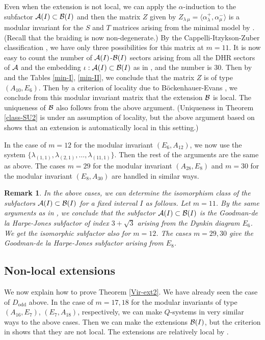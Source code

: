 \documentclass[12pt]{article}
\def\lan{\langle}
\def\ran{\rangle}
\def\a{\alpha}
\def\la{\lambda}
\newtheorem{remark}[theorem]{Remark}
\def\N{{\cal A}}
\def\M{{\cal B}}
\begin{document}
Even when the extension
is not local, we can apply the $\a$-induction to the subfactor
$\N(I)\subset \M(I)$ and then the matrix $Z$ given by
$Z_{\la\,\mu}=\lan \a^+_\la,\a^-_\mu\ran$
is a modular invariant for the $S$ and $T$ matrices arising
from the minimal model by \cite[Corollary 5.8]{BEK1}.  (Recall that
the braiding is now non-degenerate.)
By the Cappelli-Itzykson-Zuber classification \cite{CIZ}, we have only
three possibilities for this matrix at $m=11$.  It is now easy to
count the number of $\N(I)$-$\M(I)$ sectors arising from all
the DHR sectors of $\N$ and the embedding $\iota:
\N(I)\subset \M(I)$ as in \cite{BEK1,BEK2}, and
the number is 30.  Then by \cite{BEK1} and the Tables 
\ref{min-I}, \ref{min-II},
we conclude that the matrix $Z$ is of type $(A_{10}, E_6)$.
Then by a criterion of locality due to B\"ockenhauer-Evans
\cite[Proposition 3.2]{BE4}, we conclude from this modular invariant
matrix that the extension $\M$ is local.  The uniqueness of
$\M$ also follows from the above argument.
(Uniqueness in Theorem \ref{class-SU2} is under an assumption of
locality, but the above argument based on \cite{BE4} shows that
an extension is automatically local in this setting.)

In the case of $m=12$ for the modular invariant $(E_6, A_{12})$,
we now use the system
$\{\la_{(1,1)},\la_{(2,1)},\dots,\la_{(11,1)}\}$.  Then the
rest of the arguments are the same as above.
The cases $m=29$ for the modular invariant $(A_{28},E_8)$
and $m=30$ for the modular invariant $(E_8, A_{30})$ are handled
in similar ways.

\begin{remark}{\rm
In the above cases, we can determine the isomorphism class of the 
subfactors $\N(I)\subset \M(I)$ for a fixed interval $I$ as follows.
Let $m=11$.  By the same arguments as in \cite[Appendix]{BEK2},
we conclude that the subfactor $\N(I)\subset \M(I)$ is the Goodman-de 
la Harpe-Jones subfactor \cite[Section 4.5]{GHJ} of index $3+\sqrt3$
arising from the Dynkin diagram $E_6$.  We get the isomorphic
subfactor also for $m=12$.  The cases $m=29,30$ give the
Goodman-de la Harpe-Jones subfactor arising from $E_8$.
}\end{remark}

\subsection{Non-local extensions}

We now explain how to prove Theorem \ref{Vir-ext2}.
We have already seen the case of $D_{\text{odd}}$ above. 
In the case of $m=17,18$ for the modular invariants
of type $(A_{16}, E_7)$, $(E_7, A_{18})$, respectively,
we can make $Q$-systems in very similar ways to the above
cases.  Then we can make the extensions $\M(I)$, but
the criterion in \cite[Proposition 3.2]{BE4} shows that
they are not local. The extensions are relatively 
local by \cite[Th. 4.9]{LR}.
\end{document}
